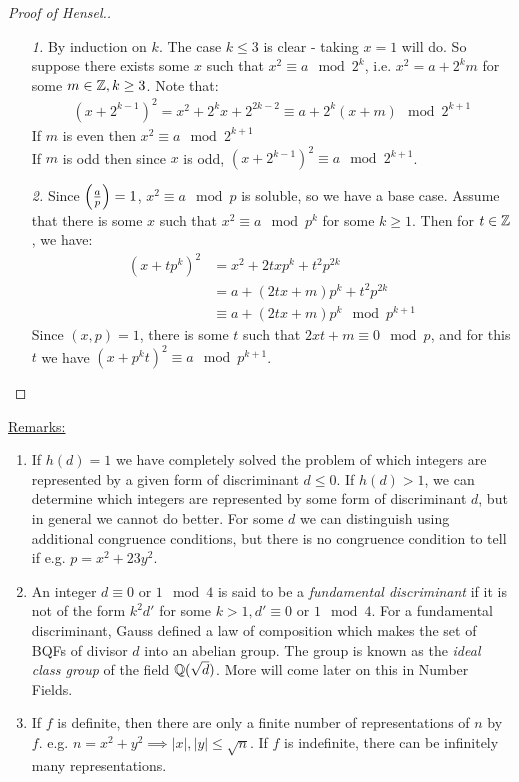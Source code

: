 \documentclass[10pt,a4paper]{article}
\begin{document}
\begin{proof}[Proof of Hensel.]
\begin{itemize}
\item[\textit{1.}] By induction on $k$. The case $k \leq 3$ is clear - taking $x = 1$ will do. So suppose there exists some $x$ such that $x^2 \equiv a \mod 2^k$, i.e. $x^2 = a + 2^k m$ for some $m \in \mathbb{Z}, k \geq 3$. Note that:
\begin{align*}
(x+2^{k-1})^2 = x^2 + 2^k x + 2^{2k-2} \equiv a + 2^k(x+m)  \mod 2^{k+1}
\end{align*}
If $m$ is even then $x^2 \equiv a \mod 2^{k+1}$\\
If $m$ is odd then since $x$ is odd, $(x+2^{k-1})^2 \equiv a \mod 2^{k+1}$.

\item[\textit{2.}] Since $\left(\frac{a}{p}\right)=1$, $x^2 \equiv a \mod p$ is soluble, so we have a base case. Assume that there is some $x$ such that $x^2 \equiv a \mod p^k$ for some $k \geq 1$. Then for $t \in \mathbb{Z}$, we have:
\begin{align*}
(x+tp^k)^2 &= x^2 + 2txp^k + t^2 p^{2k}\\
&= a + (2tx + m)p^k + t^2p^{2k}\\
&\equiv a + (2tx+m)p^k \mod p^{k+1}
\end{align*}
Since $(x,p) = 1$, there is some $t$ such that $2xt+m \equiv 0 \mod p$, and for this $t$ we have $(x+p^k t)^2 \equiv a \mod p^{k+1}$.
\end{itemize}
\end{proof}
\underline{Remarks:}
\begin{enumerate}
\item If $h(d) = 1$ we have completely solved the problem of which integers are represented by a given form of discriminant $d \leq 0$. If $h(d) > 1$, we can determine which integers are represented by some form of discriminant $d$, but in general we cannot do better. For some $d$ we can distinguish using additional congruence conditions, but there is no congruence condition to tell if e.g. $p = x^2 + 23y^2$.
\item An integer $d \equiv 0$ or $1 \mod 4$ is said to be a \emph{fundamental discriminant} if it is not of the form $k^2 d'$ for some $k>1, d' \equiv 0$ or $1 \mod 4$. For a fundamental discriminant, Gauss defined a law of composition which makes the set of BQFs of divisor $d$ into an abelian group. The group is known as the \emph{ideal class group} of the field $\mathbb{Q}(\sqrt{d})$. More will come later on this in Number Fields.
\item If $f$ is definite, then there are only a finite number of representations of $n$ by $f$. e.g. $n = x^2 + y^2 \implies |x|, |y| \leq \sqrt{n}$. If $f$ is indefinite, there can be infinitely many representations.
\end{enumerate}
\end{document}
